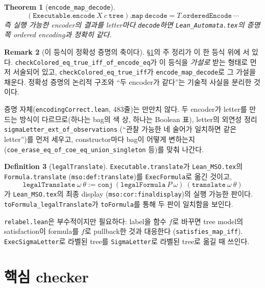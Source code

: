 \documentclass[11pt]{article}
\theoremstyle{definition}
\newtheorem{definition}{Definition}[section]
\newtheorem{remark}[definition]{Remark}
\theoremstyle{plain}
\newtheorem{theorem}[definition]{Theorem}
\newcommand{\lean}[1]{\texttt{#1}}
\newcommand{\leanfile}[1]{\texttt{#1}}
\begin{document}
\begin{theorem}[\lean{encode\_map\_decode}]
\label{alg:thm:encodecorrect}
\[
  (\lean{Executable.encode}\ X\ c\ \lean{tree}).\lean{map}\ \lean{decode}
  = T.\lean{orderedEncode}\ \cdots
\]
즉 실행 가능한 encoder의 결과를 letter마다 \lean{decode}하면
\leanfile{Lean\_Automata.tex}의 증명 쪽 ordered encoding과 \emph{정확히
같다}.
\end{theorem}

\begin{remark}[이 등식이 정확성 증명의 축이다]
\label{alg:rem:encodecorrectaxis}
\S\ref{alg:sec:modelcheck}의 주 정리가 이 한 등식 위에 서 있다.
\lean{checkColored\_eq\_true\_iff\_of\_encode\_eq}가 이 등식을 \emph{가설로}
받는 형태로 먼저 서술되어 있고, \lean{checkColored\_eq\_true\_iff}가
\lean{encode\_map\_decode}로 그 가설을 채운다. 정확성 증명의 논리적 구조와
``두 encoder가 같다''는 기술적 사실을 분리한 것이다.

증명 자체(\leanfile{encodingCorrect.lean}, 483줄)는 만만치 않다. 두 encoder가
letter를 만드는 방식이 다르므로(하나는 bag의 색 상, 하나는 Boolean 표),
letter의 외연성 정리 \lean{sigmaLetter\_ext\_of\_observations}
(``관찰 가능한 네 술어가 일치하면 같은 letter'')를 먼저 세우고,
constructor마다 bag이 어떻게 변하는지
(\lean{coe\_erase\_eq\_of\_coe\_eq\_union\_singleton} 등)를 맞춰 나간다.
\end{remark}

\begin{definition}[\lean{legalTranslate}]
\label{alg:def:legaltranslate}
\lean{Executable.translate}가 \leanfile{Lean\_MSO.tex}의
\lean{Formula.translate} (\lean{mso:def:translate})를 \lean{ExecFormula}로
옮긴 것이고,
\[
  \lean{legalTranslate}\ \omega\ \theta :=
    \lean{conj}\ (\lean{legalFormula}\ P\ \omega)\ (\lean{translate}\ \omega\ \theta)
\]
가 \leanfile{Lean\_MSO.tex}의 최종 display
(\lean{mso:cor:finaldisplay})의 실행 가능한 판이다.
\lean{toFormula\_legalTranslate}가 \lean{toFormula}를 통해 두 판이 일치함을
보인다.
\end{definition}

\leanfile{relabel.lean}은 부수적이지만 필요하다: label을 함수 $f$로 바꾸면
tree model의 satisfaction이 formula를 $f$로 pullback한 것과 대응한다
(\lean{satisfies\_map\_iff}). \lean{ExecSigmaLetter}로 라벨된 tree를
\lean{SigmaLetter}로 라벨된 tree로 옮길 때 쓰인다.

\section{핵심 checker}
\label{alg:sec:modelcheck}
\end{document}
